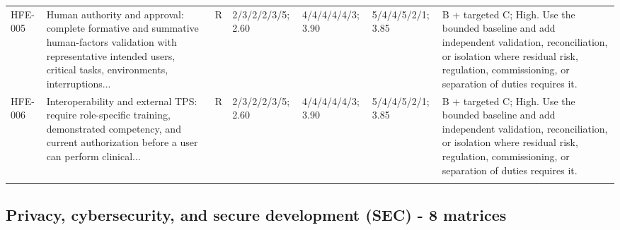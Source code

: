 \documentclass[11pt,letterpaper]{article}
\begin{document}
\begin{scriptsize}
\begin{longtable}{@{}L{0.11\textwidth}L{0.165\textwidth}L{0.04\textwidth}L{0.115\textwidth}L{0.115\textwidth}L{0.115\textwidth}L{0.235\textwidth}@{}}
\addlinespace[2pt]
HFE-005 & Human authority and approval: complete formative and summative human-factors validation with representative intended users, critical tasks, environments, interruptions... & R & 2/3/2/2/3/5; 2.60 & 4/4/4/4/4/3; 3.90 & 5/4/4/5/2/1; 3.85 & B + targeted C; High. Use the bounded baseline and add independent validation, reconciliation, or isolation where residual risk, regulation, commissioning, or separation of duties requires it. \\
\addlinespace[2pt]
HFE-006 & Interoperability and external TPS: require role-specific training, demonstrated competency, and current authorization before a user can perform clinical... & R & 2/3/2/2/3/5; 2.60 & 4/4/4/4/4/3; 3.90 & 5/4/4/5/2/1; 3.85 & B + targeted C; High. Use the bounded baseline and add independent validation, reconciliation, or isolation where residual risk, regulation, commissioning, or separation of duties requires it. \\
\addlinespace[2pt]
\end{longtable}
\end{scriptsize}

\subsection{Privacy, cybersecurity, and secure development (SEC) - 8 matrices}
\end{document}
